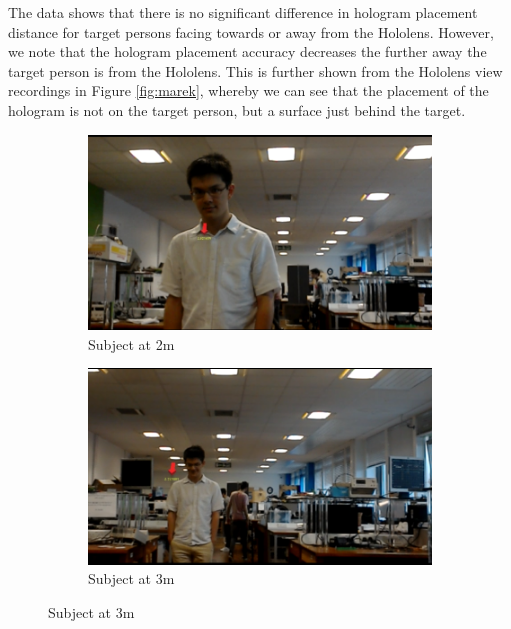 The data shows that there is no significant difference in hologram placement distance for target persons facing towards or away from the Hololens. However, we note that the hologram placement accuracy decreases the further away the target person is from the Hololens. This is further shown from the Hololens view recordings in Figure \ref{fig:marek}, whereby we can see that the placement of the hologram is not on the target person, but a surface just behind the target.

\begin{figure}[ht]
	\begin{subfigure}[b]{.32\textwidth}
		\centering
		\includegraphics[width=1.0\linewidth]{img/chapter6_test/marek.png}
		\caption{Subject at 2m}
	\end{subfigure}%
	\hspace{\fill} 
	\begin{subfigure}[b]{.32\textwidth}
		\centering
		\includegraphics[width=1.0\linewidth]{img/chapter6_test/marek1.png}
		\caption{Subject at 3m}
	\end{subfigure}
	\hspace{\fill} 

\end{figure}
